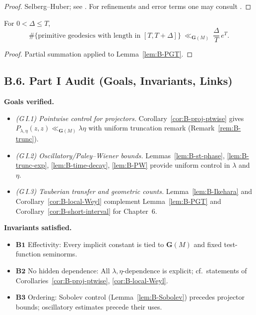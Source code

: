 \begin{proof}
Selberg–Huber; see \cite{Selberg1956,Huber1959}. For refinements and error terms one may consult \cite{Iwaniec2002}.
\end{proof}

\begin{corollary}\label{cor:B-short-interval}
For \(0<\Delta\le T\),
\[
\#\{\text{primitive geodesics with length in }[T,T+\Delta]\}\ \ll_{\mathbf{G}(M)}\ \frac{\Delta}{T}\,e^{T}.
\]
\end{corollary}

\begin{proof}
Partial summation applied to Lemma~\ref{lem:B-PGT}.
\end{proof}

\bigskip
\subsection*{B.6. Part I Audit (Goals, Invariants, Links)}
\noindent\textbf{Goals verified.}
\begin{itemize}
  \item \emph{(G\,I.1) Pointwise control for projectors.} Corollary~\ref{cor:B-proj-ptwise} gives \(P_{\lambda,\eta}(z,z)\ll_{\mathbf{G}(M)}\lambda\eta\) with uniform truncation remark (Remark~\ref{rem:B-trunc}).
  \item \emph{(G\,I.2) Oscillatory/Paley–Wiener bounds.} Lemmas~\ref{lem:B-st-phase}, \ref{lem:B-trunc-exp}, \ref{lem:B-time-decay}, \ref{lem:B-PW} provide uniform control in \(\lambda\) and \(\eta\).
  \item \emph{(G\,I.3) Tauberian transfer and geometric counts.} Lemma~\ref{lem:B-Ikehara} and Corollary~\ref{cor:B-local-Weyl} complement Lemma~\ref{lem:B-PGT} and Corollary~\ref{cor:B-short-interval} for Chapter~6.
\end{itemize}

\noindent\textbf{Invariants satisfied.}
\begin{itemize}
  \item \(\mathbf{B1}\) Effectivity: Every implicit constant is tied to \(\mathbf{G}(M)\) and fixed test-function seminorms.
  \item \(\mathbf{B2}\) No hidden dependence: All \(\lambda,\eta\)-dependence is explicit; cf.\ statements of Corollaries~\ref{cor:B-proj-ptwise}, \ref{cor:B-local-Weyl}.
  \item \(\mathbf{B3}\) Ordering: Sobolev control (Lemma~\ref{lem:B-Sobolev}) precedes projector bounds; oscillatory estimates precede their uses.
\end{itemize}

